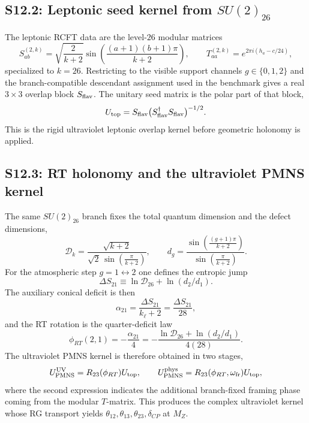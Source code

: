 \documentclass[11pt]{article}
\begin{document}
\subsection*{S12.2: Leptonic seed kernel from $SU(2)_{26}$}

The leptonic RCFT data are the level-$26$ modular matrices
\begin{equation}
 S^{(2,k)}_{ab}
 =
 \sqrt{\frac{2}{k+2}}
 \sin\!\left(\frac{(a+1)(b+1)\pi}{k+2}\right),
 \qquad
 T^{(2,k)}_{aa}=e^{2\pi i(h_a-c/24)},
\end{equation}
specialized to $k=26$. Restricting to the visible support channels
$g\in\{0,1,2\}$ and the branch-compatible descendant assignment used in the
benchmark gives a real $3\times3$ overlap block $S_{\rm flav}$. The unitary seed
matrix is the polar part of that block,
\begin{equation}
 U_{\rm top}
 =
 S_{\rm flav}\bigl(S_{\rm flav}^{\dagger}S_{\rm flav}\bigr)^{-1/2}.
\end{equation}
This is the rigid ultraviolet leptonic overlap kernel before geometric
holonomy is applied.

\subsection*{S12.3: RT holonomy and the ultraviolet PMNS kernel}

The same $SU(2)_{26}$ branch fixes the total quantum dimension and the defect
dimensions,
\begin{equation}
 \mathcal D_k
 =
 \frac{\sqrt{k+2}}{\sqrt{2}\,\sin\!\left(\frac{\pi}{k+2}\right)},
 \qquad
 d_g
 =
 \frac{\sin\!\left(\frac{(g+1)\pi}{k+2}\right)}{\sin\!\left(\frac{\pi}{k+2}\right)}.
\end{equation}
For the atmospheric step $g=1\leftrightarrow2$ one defines the entropic jump
\begin{equation}
 \Delta S_{21}
 \equiv
 \ln\mathcal D_{26}+\ln(d_2/d_1).
\end{equation}
The auxiliary conical deficit is then
\begin{equation}
 \alpha_{21}=\frac{\Delta S_{21}}{k_{\ell}+2}=\frac{\Delta S_{21}}{28},
\end{equation}
and the RT rotation is the quarter-deficit law
\begin{equation}
 \phi_{RT}(2,1)
 =
 -\frac{\alpha_{21}}{4}
 =
 -\frac{\ln\mathcal D_{26}+\ln(d_2/d_1)}{4(28)}.
\end{equation}
The ultraviolet PMNS kernel is therefore obtained in two stages,
\begin{equation}
 U_{\rm PMNS}^{\rm UV}=R_{23}(\phi_{RT})U_{\rm top},
 \qquad
 U_{\rm PMNS}^{\rm phys}=R_{23}(\phi_{RT},\omega_{\rm fr})U_{\rm top},
\end{equation}
where the second expression indicates the additional branch-fixed framing phase
coming from the modular $T$-matrix. This produces the complex ultraviolet
kernel whose RG transport yields
$\theta_{12},\theta_{13},\theta_{23},\delta_{CP}$ at $M_Z$.
\end{document}
